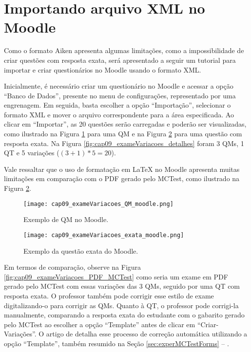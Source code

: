 \section{Importando arquivo XML no Moodle}

Como o formato Aiken apresenta algumas limitações, como a impossibilidade de criar questões com resposta exata, será apresentado a seguir um tutorial para importar e criar questionários no Moodle usando o formato XML.

Inicialmente, é necessário criar um questionário no Moodle e acessar a opção ``Banco de Dados'', presente no menu de configurações, representado por uma engrenagem. Em seguida, basta escolher a opção ``Importação'', selecionar o formato XML e mover o arquivo correspondente para a área especificada. Ao clicar em ``Importar'', as 20 questões serão carregadas e poderão ser visualizadas, como ilustrado na Figura \ref{fig:cap09_exameVariacoes_QM_moodle} para uma QM e na Figura \ref{fig:cap09_exameVariacoes_exata_moodle} para uma questão com resposta exata. Na Figura \ref{fig:cap09_exameVariacoes_detalhes} foram 3 QMs, 1 QT e 5 variações ($(3+1)*5=20$).

Vale ressaltar que o uso de formatação em \LaTeX{} no Moodle apresenta muitas limitações em comparação com o PDF gerado pelo MCTest, como ilustrado na Figura \ref{fig:cap09_exameVariacoes_exata_moodle}.

\begin{figure}[!ht]
\centering
  \texttt{[image: cap09\_exameVariacoes\_QM\_moodle.png]}
    \caption{Exemplo de QM no Moodle.}
  \label{fig:cap09_exameVariacoes_QM_moodle}
\end{figure}

\begin{figure}
\centering
  \texttt{[image: cap09\_exameVariacoes\_exata\_moodle.png]}
  \caption{Exemplo da questão exata do Moodle.}
  \label{fig:cap09_exameVariacoes_exata_moodle}
\end{figure}

Em termos de comparação, observe na Figura \ref{fig:cap09_exameVariacoes_PDF_MCTest} como seria um exame em PDF gerado pelo MCTest com essas variações das 3 QMs, seguido por uma QT com resposta exata. O professor também pode corrigir esse estilo de exame digitalizando-o para corrigir as QMs. Quanto à QT, o professor pode corrigi-la manualmente, comparando a resposta exata do estudante com o gabarito gerado pelo MCTest ao escolher a opção ``Template'' antes de clicar em ``Criar-Variações''. O artigo de  detalha esse processo de correção automática utilizando a opção ``Template'', também resumido na Seção \ref{sec:experMCTestForms} -- .



